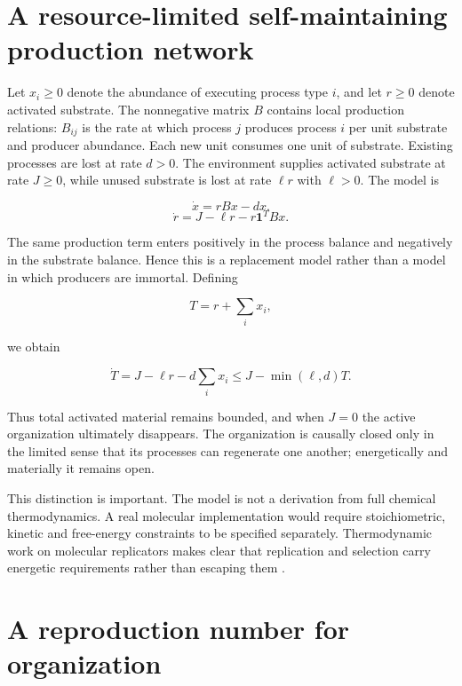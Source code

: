 \documentclass[11pt,a4paper]{article}
\begin{document}
\section{A resource-limited self-maintaining production
network}\label{a-resource-limited-self-maintaining-production-network}

Let \(x_i \geq 0\) denote the abundance of executing process type \(i\),
and let \(r \geq 0\) denote activated substrate. The nonnegative matrix
\(B\) contains local production relations: \(B_{ij}\) is the rate at
which process \(j\) produces process \(i\) per unit substrate and
producer abundance. Each new unit consumes one unit of substrate.
Existing processes are lost at rate \(d>0\). The environment supplies
activated substrate at rate \(J\geq0\), while unused substrate is lost at
rate \(\ell r\) with \(\ell>0\). The model is

\begin{equation}
\dot{x}=rBx-dx.
\label{eq:base-x}
\end{equation}
\begin{equation}
\dot r=J-\ell r-r\mathbf{1}^TBx.
\label{eq:base-r}
\end{equation}

The same production term enters positively in the process balance and
negatively in the substrate balance. Hence this is a replacement model
rather than a model in which producers are immortal. Defining

\[
T = r + \sum_i x_i,
\]

we obtain

\[
\dot{T} = J - \ell r - d\sum_i x_i \leq J - \min(\ell, d)T.
\]

Thus total activated material remains bounded, and when \(J = 0\) the
active organization ultimately disappears. The organization is causally
closed only in the limited sense that its processes can regenerate one
another; energetically and materially it remains open.

This distinction is important. The model is not a derivation from full
chemical thermodynamics. A real molecular implementation would require
stoichiometric, kinetic and free-energy constraints to be specified
separately. Thermodynamic work on molecular replicators makes clear that
replication and selection carry energetic requirements rather than
escaping them \citep{Kolchinsky2025}.

\section{A reproduction number for
organization}\label{a-reproduction-number-for-organization}
\end{document}
